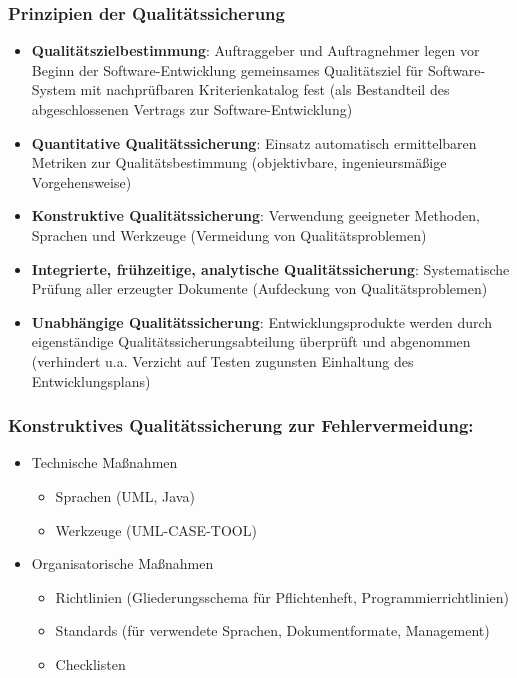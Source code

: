 	\subsubsection{Prinzipien der Qualitätssicherung}
	\begin{itemize}
		\item \textbf{Qualitätszielbestimmung}: Auftraggeber und Auftragnehmer legen vor Beginn der Software-Entwicklung gemeinsames Qualitätsziel für Software-System mit nachprüfbaren Kriterienkatalog fest (als Bestandteil des abgeschlossenen Vertrags zur Software-Entwicklung)
		\item \textbf{Quantitative Qualitätssicherung}: Einsatz automatisch ermittelbaren Metriken zur Qualitätsbestimmung (objektivbare, ingenieursmäßige Vorgehensweise)
		\item \textbf{Konstruktive Qualitätssicherung}: Verwendung geeigneter Methoden, Sprachen und Werkzeuge (Vermeidung von Qualitätsproblemen)
		\item \textbf{Integrierte, frühzeitige, analytische Qualitätssicherung}: Systematische Prüfung aller erzeugter Dokumente (Aufdeckung von Qualitätsproblemen)
		\item \textbf{Unabhängige Qualitätssicherung}: Entwicklungsprodukte werden durch eigenständige Qualitätssicherungsabteilung überprüft und abgenommen (verhindert u.a. Verzicht auf Testen zugunsten Einhaltung des Entwicklungsplans)
	\end{itemize}
	\subsubsection{Konstruktives Qualitätssicherung zur Fehlervermeidung:} 
	\begin{itemize}
		\item Technische Maßnahmen
		\begin{itemize}
			\item Sprachen (UML, Java)
			\item Werkzeuge (UML-CASE-TOOL)
		\end{itemize}
		\item Organisatorische Maßnahmen
		\begin{itemize}
			\item Richtlinien (Gliederungsschema für Pflichtenheft, Programmierrichtlinien)
			\item Standards (für verwendete Sprachen, Dokumentformate, Management)
			\item Checklisten
		\end{itemize}
	\end{itemize}
